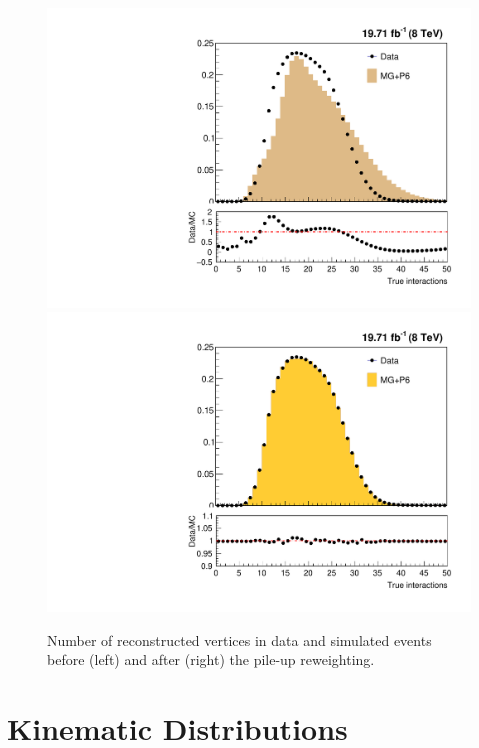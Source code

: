 \begin{figure}[!htbp]
  \begin{center}
    \includegraphics[scale = 0.4]{Plots_HT_2_150/Nvertices.pdf}%
    \includegraphics[scale = 0.4]{Plots_HT_2_150/Nvertices_weight.pdf}
    \caption{Number of reconstructed vertices in data and simulated events before (left) and after (right) the pile-up reweighting.}
    \label{fig:pileup}
  \end{center}
\end{figure}

\section{Kinematic Distributions}

